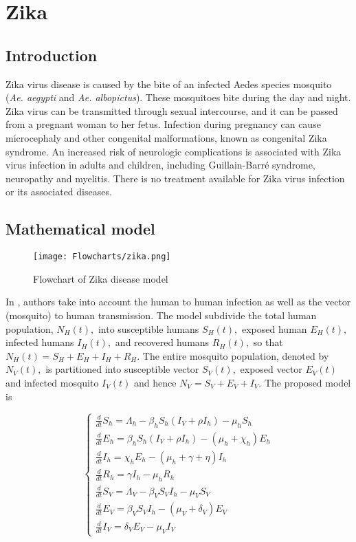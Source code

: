 \documentclass{book}\usepackage[]{graphicx}\usepackage[]{color}
\begin{document}
\section{Zika}
\subsection*{Introduction}
 Zika virus disease is caused by the bite of an infected Aedes species mosquito (\textit{Ae. aegypti} and \textit{Ae. albopictus}). These mosquitoes bite during the day and night.
 Zika virus can be transmitted through sexual intercourse, and it can be passed from a pregnant woman to her fetus. Infection during pregnancy can cause microcephaly and other congenital malformations, known as congenital Zika syndrome. An increased risk of neurologic complications is associated with Zika virus infection in adults and children, including Guillain-Barré syndrome, neuropathy and myelitis. There is no treatment available for Zika virus infection or its associated diseases.

\subsection*{Mathematical model}

\begin{figure}
    \centering
    \texttt{[image: Flowcharts/zika.png]}
    \caption{Flowchart of Zika disease model}
    \label{fig:zika_flow}
\end{figure}
In \cite{bonyah2017theoretical}, authors take into account the human to human infection as well as the vector (mosquito) to human transmission. The model subdivide the total human population, $N_{H}(t),$ into susceptible humans $S_{H}(t),$ exposed human $E_{H}(t),$ infected humans $I_{H}(t),$ and recovered humans $R_{H}(t),$ so that $N_{H}(t)=S_{H}+E_{H}+I_{H}+R_{H}$. The entire mosquito population, denoted by $N_{V}(t),$ is partitioned into susceptible vector $S_{V}(t),$ exposed vector $E_{V}(t)$ and infected mosquito $I_{V}(t)$ and hence $N_{V}=S_{V}+E_{V}+I_{V}$. The proposed model is

\begin{equation} \label{eq:zika_model}
\left\{\begin{array}{l}
\frac{d}{d t} S_{h}=\Lambda_{h}-\beta_{h} S_{h}\left(I_{V}+\rho I_{h}\right)-\mu_{h} S_{h} \\
\frac{d}{d t} E_{h}=\beta_{h} S_{h}\left(I_{V}+\rho I_{h}\right)-\left(\mu_{h}+\chi_{h}\right) E_{h} \\
\frac{d}{d t} I_{h}=\chi_{h} E_{h}-\left(\mu_{h}+\gamma+\eta\right) I_{h} \\
\frac{d}{d t} R_{h}=\gamma I_{h}-\mu_{h} R_{h} \\[2ex]
\frac{d}{d t} S_{V}=\Lambda_{V}-\beta_{V} S_{V} I_{h}-\mu_{V} S_{V} \\
\frac{d}{d t} E_{V}=\beta_{V} S_{V} I_{h}-\left(\mu_{V}+\delta_{V}\right) E_{V} \\
\frac{d}{d t} I_{V}=\delta_{V} E_{V}-\mu_{V} I_{V}
\end{array}\right.
\end{equation}
\end{document}
